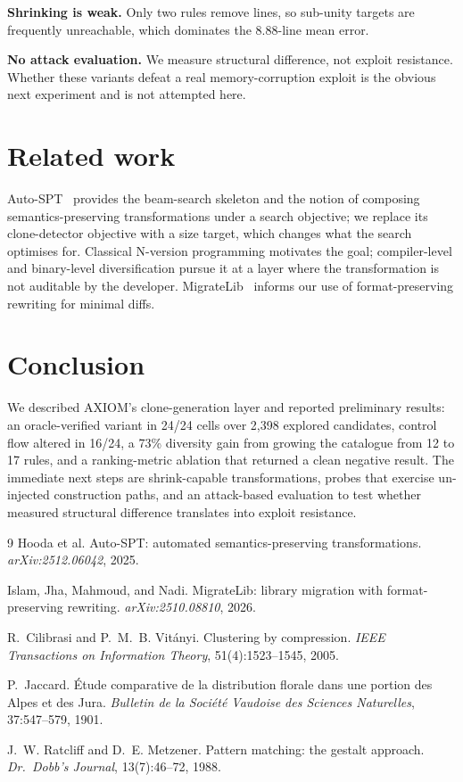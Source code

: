 \documentclass[10pt,twocolumn]{article}
\begin{document}
\textbf{Shrinking is weak.} Only two rules remove lines, so sub-unity targets
are frequently unreachable, which dominates the 8.88-line mean error.

\textbf{No attack evaluation.} We measure structural difference, not exploit
resistance. Whether these variants defeat a real memory-corruption exploit is
the obvious next experiment and is not attempted here.

\section{Related work}

Auto-SPT~\cite{autospt} provides the beam-search skeleton and the notion of
composing semantics-preserving transformations under a search objective; we
replace its clone-detector objective with a size target, which changes what the
search optimises for. Classical N-version programming motivates the goal;
compiler-level and binary-level diversification pursue it at a layer where the
transformation is not auditable by the developer. MigrateLib~\cite{migratelib}
informs our use of format-preserving rewriting for minimal diffs.

\section{Conclusion}

We described AXIOM's clone-generation layer and reported preliminary results: an
oracle-verified variant in 24/24 cells over 2{,}398 explored candidates, control
flow altered in 16/24, a 73\% diversity gain from growing the catalogue from 12
to 17 rules, and a ranking-metric ablation that returned a clean negative
result. The immediate next steps are shrink-capable transformations, probes that
exercise un-injected construction paths, and an attack-based evaluation to test
whether measured structural difference translates into exploit resistance.

\begin{thebibliography}{9}
\small
{}
Hooda et al.
\newblock Auto-SPT: automated semantics-preserving transformations.
\newblock \emph{arXiv:2512.06042}, 2025.

Islam, Jha, Mahmoud, and Nadi.
\newblock MigrateLib: library migration with format-preserving rewriting.
\newblock \emph{arXiv:2510.08810}, 2026.

R.~Cilibrasi and P.~M.~B. Vit\'anyi.
\newblock Clustering by compression.
\newblock \emph{IEEE Transactions on Information Theory}, 51(4):1523--1545, 2005.

P.~Jaccard.
\newblock \'Etude comparative de la distribution florale dans une portion des
Alpes et des Jura.
\newblock \emph{Bulletin de la Soci\'et\'e Vaudoise des Sciences Naturelles},
37:547--579, 1901.

J.~W. Ratcliff and D.~E. Metzener.
\newblock Pattern matching: the gestalt approach.
\newblock \emph{Dr.~Dobb's Journal}, 13(7):46--72, 1988.
\end{thebibliography}

\balance
\end{document}

